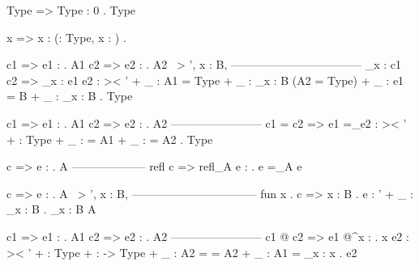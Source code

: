 Type => Type : 0 . Type

x => x : (\alpha : Type, x : \alpha) . \alpha

c1 => e1 :  . A1
c2 => e2 :  . A2
 ~> ', x : B, \Delta
-----------------------------------
\Pi_{x : c1} c2 =>
    \Pi_{x : e1} e2 :
     >< ' + _ : A1 = Type + _ : \Pi_{x : B} (A2 = Type) + _ : e1 = B + _ : \Pi_{x : B} \Delta .
    Type

c1 => e1 :  . A1
c2 => e2 :  . A2
------------------------
c1 = c2 =>
    e1 =_\alpha e2 :
     >< ' + \alpha : Type + _ : \alpha = A1 + _ : \alpha = A2 .
    Type

c => e : \Gamma . A
--------------------
refl c => refl_A e : \Gamma . e =_A e

c => e : \Gamma . A
\Gamma ~> \Gamma', x : B, \Delta
---------------------------------
fun x . c => \fun x : B . e : \Gamma' + _ : \Pi_{x : B} \Delta . \Pi_{x : B} A

c1 => e1 :  . A1
c2 => e2 :  . A2
------------------------
c1 @ c2 =>
    e1 @^{x : \alpha . \beta x} e2 :
     >< ' + \alpha : Type + \beta : \alpha -> Type + _ : A2 = \alpha = A2  + _ : A1 = \Pi_{x : \alpha} \beta x .
    \beta e2

